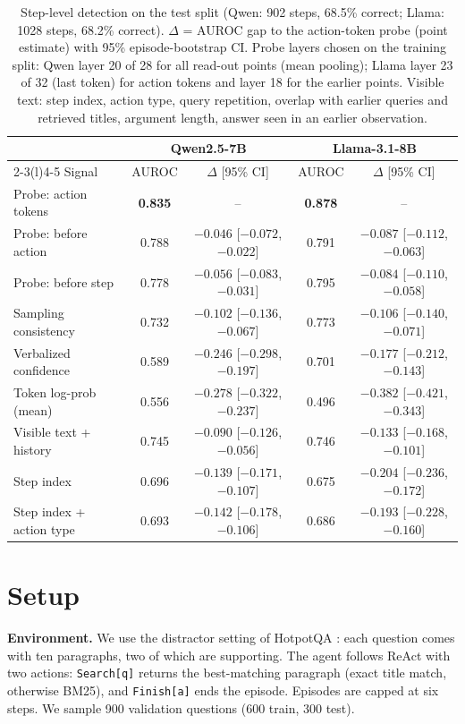 \documentclass[10pt,twocolumn]{article}
\begin{document}
\begin{table}[t]
\centering\small
\caption{Step-level detection on the test split (Qwen: 902 steps, 68.5\% correct; Llama: 1028 steps, 68.2\%
correct). $\Delta$ = AUROC gap to the action-token probe (point estimate) with 95\% episode-bootstrap CI. Probe
layers chosen on the training split: Qwen layer 20 of 28 for all read-out points (mean pooling); Llama layer 23 of 32
(last token) for action tokens and layer 18 for the earlier points. Visible text: step index, action type, query
repetition, overlap with earlier queries and retrieved titles, argument length, answer seen in an earlier observation.}
\label{tab:rq1}
\begin{tabular}{@{}lcccc@{}}
\toprule
& \multicolumn{2}{c}{Qwen2.5-7B} & \multicolumn{2}{c}{Llama-3.1-8B} \\
\cmidrule(lr){2-3}\cmidrule(l){4-5}
Signal & AUROC & $\Delta$ [95\% CI] & AUROC & $\Delta$ [95\% CI] \\
\midrule
Probe: action tokens & \textbf{0.835} & -- & \textbf{0.878} & -- \\
Probe: before action & 0.788 & $-0.046$ [$-0.072$, $-0.022$] & 0.791 & $-0.087$ [$-0.112$, $-0.063$] \\
Probe: before step & 0.778 & $-0.056$ [$-0.083$, $-0.031$] & 0.795 & $-0.084$ [$-0.110$, $-0.058$] \\
Sampling consistency & 0.732 & $-0.102$ [$-0.136$, $-0.067$] & 0.773 & $-0.106$ [$-0.140$, $-0.071$] \\
Verbalized confidence & 0.589 & $-0.246$ [$-0.298$, $-0.197$] & 0.701 & $-0.177$ [$-0.212$, $-0.143$] \\
Token log-prob (mean) & 0.556 & $-0.278$ [$-0.322$, $-0.237$] & 0.496 & $-0.382$ [$-0.421$, $-0.343$] \\
\midrule
Visible text + history & 0.745 & $-0.090$ [$-0.126$, $-0.056$] & 0.746 & $-0.133$ [$-0.168$, $-0.101$] \\
Step index & 0.696 & $-0.139$ [$-0.171$, $-0.107$] & 0.675 & $-0.204$ [$-0.236$, $-0.172$] \\
Step index + action type & 0.693 & $-0.142$ [$-0.178$, $-0.106$] & 0.686 & $-0.193$ [$-0.228$, $-0.160$] \\
\bottomrule
\end{tabular}
\end{table}

\section{Setup}
\textbf{Environment.} We use the distractor setting of HotpotQA \citep{yang2018hotpotqa}: each question comes with
ten paragraphs, two of which are supporting. The agent follows ReAct \citep{yao2023react} with two actions:
\texttt{Search[q]} returns the best-matching paragraph (exact title match, otherwise BM25), and \texttt{Finish[a]}
ends the episode. Episodes are capped at six steps. We sample 900 validation questions (600 train, 300 test).
\end{document}
